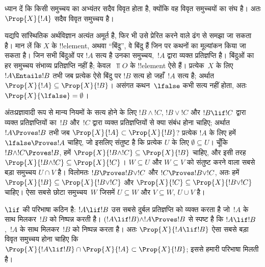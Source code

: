 \documentclass[../../../include/open-logic-section]{subfiles}
\begin{document}
ध्यान दें कि किसी समुच्चय का अभ्यंतर सदैव विवृत होता है, क्योंकि वह विवृत
समुच्चयों का संघ है। अतः $\Prop{X}{!A}$ सदैव विवृत समुच्चय है।

यद्यपि सांस्थितिक अर्थविज्ञान अत्यंत अमूर्त है, फिर भी उसे प्रेरित करने वाले
ढंग से समझा जा सकता है। मान लें कि $X$ के !!{element}, अथवा ``बिंदु'', वे
बिंदु हैं जिन पर कथनों का मूल्यांकन किया जा सकता है। जिन सभी बिंदुओं पर
$!A$ सत्य है उनका समुच्चय,~$!A$ द्वारा व्यक्त प्रतिज्ञप्ति है। बिंदुओं का
हर समुच्चय संभाव्य प्रतिज्ञप्ति नहीं है; केवल~$\Top{O}$ के !!{element} ऐसे हैं।
प्रत्येक~$X$ के लिए $!A \Entails !B$ तभी जब प्रत्येक ऐसे बिंदु पर $!B$ सत्य
हो जहाँ~$!A$ सत्य है; अर्थात
$\Prop{X}{!A} \subseteq \Prop{X}{!B}$। असंगत कथन~$\lfalse$ कभी सत्य नहीं
होता, अतः $\Prop{X}{\lfalse} = \emptyset$।

अंतःप्रज्ञावादी रूप से मान्य नियमों के सत्य होने के लिए $!B \land !C$,
$!B \lor !C$ और $!B \lif !C$ द्वारा व्यक्त प्रतिज्ञप्तियों का~$!B$ और~$!C$
द्वारा व्यक्त प्रतिज्ञप्तियों से क्या संबंध होना चाहिए; अर्थात
$!A \Proves !B$ तभी जब $\Prop{X}{!A} \subset \Prop{X}{!B}$? प्रत्येक $!A$
के लिए हमें $\lfalse \Proves !A$ चाहिए, जो इसलिए संतुष्ट है कि प्रत्येक
$U$ के लिए $\emptyset \subseteq U$। चूँकि $!B \land !C \Proves !B$, हमें
$\Prop{X}{!B \land !C} \subseteq \Prop{X}{!B}$ चाहिए, और इसी तरह
$\Prop{X}{!B \land !C} \subseteq \Prop{X}{!C}$। $W \subseteq U$ और
$W \subseteq V$ को संतुष्ट करने वाला सबसे बड़ा समुच्चय $U \cap V$ है।
विलोमतः $!B \Proves !B \lor !C$ और $!C \Proves !B \lor !C$, अतः हमें
$\Prop{X}{!B} \subseteq \Prop{X}{!B \lor !C}$ और
$\Prop{X}{!C} \subseteq \Prop{X}{!B \lor !C}$ चाहिए। ऐसा सबसे छोटा
समुच्चय~$W$ जिसमें $U \subseteq W$ और $V \subseteq W$, $U \cup V$ है।

$\lif$ की परिभाषा कठिन है: $!A \lif !B$ उस सबसे दुर्बल प्रतिज्ञप्ति को
व्यक्त करता है जो~$!A$ के साथ मिलकर~$!B$ को निष्पन्न करती है।
$(!A \lif !B) \land !A \Proves !B$ से स्पष्ट है कि $!A \lif !B$,~$!A$ के
साथ मिलकर~$!B$ को निष्पन्न करता है। अतः $\Prop{X}{!A \lif !B}$ ऐसा सबसे
बड़ा विवृत समुच्चय होना चाहिए कि
$\Prop{X}{!A \lif !B} \cap \Prop{X}{!A} \subset \Prop{X}{!B}$; इससे हमारी
परिभाषा मिलती है।
\end{document}
